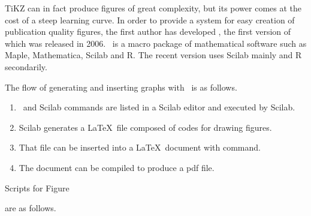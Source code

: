 \documentclass[11pt]{article}
\begin{document}

TiKZ can in fact produce figures of great complexity, but its power comes at the
cost of a steep learning curve.  In order to provide a system for easy creation
of publication quality figures, the first author has developed \ketpic, the
first version of which was released in 2006.  \ketpic\ is a macro package of
mathematical software such as Maple, Mathematica, Scilab and R.  The recent
version uses Scilab mainly and R secondarily.

The flow of generating and inserting graphs with \ketpic\ is as follows.%
\vspace{-2mm}

\begin{enumerate}
\item \ketpic\ and Scilab commands are listed in a Scilab editor and executed
  by Scilab.\vspace{-3mm}

\item Scilab generates a \LaTeX\ file composed of codes for drawing figures.\vspace{-3mm}
\item That file can be inserted into a \LaTeX\ document with \verb|| command.
\vspace{-3mm}
\item The document can be compiled to produce a pdf file.\vspace{-3mm}
\end{enumerate}

Scripts for Figure \addtocounter{figno}{-1}\thefigno\addtocounter{figno}{1}
are as follows.\vspace{-3mm}
\end{document}
